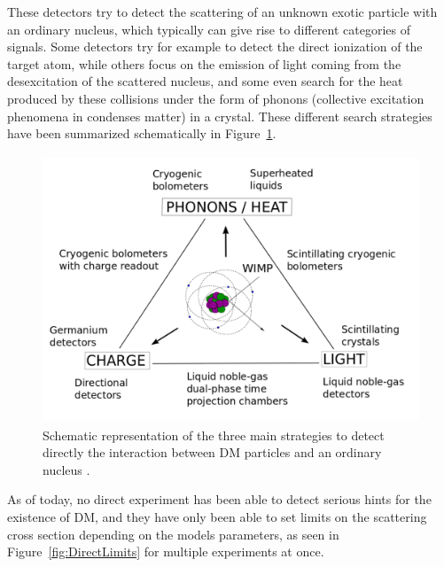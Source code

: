 \documentclass[a4paper, 10pt, openright]{report}
\begin{document}
These detectors try to detect the scattering of an unknown exotic particle with an ordinary nucleus, which typically can give rise to different categories of signals. Some detectors try for example to detect the direct ionization of the target atom, while others focus on the emission of light coming from the desexcitation of the scattered nucleus, and some even search for the heat produced by these collisions under the form of phonons (collective excitation phenomena in condenses matter) in a crystal. These different search strategies have been summarized schematically in Figure~\ref{figure:DirectWays}.

\begin{figure}[htbp]
\begin{center}
\includegraphics[width=12cm, height=8cm]{figs/DirectWays.png}
\caption{Schematic representation of the three main strategies to detect directly the interaction between \ac{DM} particles and an ordinary nucleus \cite{DirectWays}.}
\label{figure:DirectWays}
\end{center}
\end{figure}

As of today, no direct experiment has been able to detect serious hints for the existence of \ac{DM}, and they have only been able to set limits on the scattering cross section depending on the models parameters, as seen in Figure~\ref{fig:DirectLimits} for multiple experiments at once.
\end{document}
